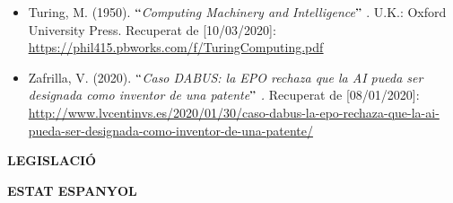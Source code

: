 \documentclass[12pt]{article}
\begin{document}
\begin{itemize}
\vspace{\baselineskip}
	\item Turing, M. (1950). \textit{$``$Computing Machinery and Intelligence$"$ }. U.K.: Oxford University Press. Recuperat de [10/03/2020]: \href{https://phil415.pbworks.com/f/TuringComputing.pdf}{\textcolor[HTML]{0000FF}{\ul{https://phil415.pbworks.com/f/TuringComputing.pdf}}}\par


\vspace{\baselineskip}
	\item Zafrilla, V. (2020). $``$\textit{Caso DABUS: la EPO rechaza que la AI pueda ser designada como inventor de una patente$"$ .} Recuperat de [08/01/2020]: \href{http://www.lvcentinvs.es/2020/01/30/caso-dabus-la-epo-rechaza-que-la-ai-pueda-ser-designada-como-inventor-de-una-patente/}{http://www.lvcentinvs.es/2020/01/30/caso-dabus-la-epo-rechaza-que-la-ai-pueda-ser-designada-como-inventor-de-una-patente/}
\end{itemize}\par


\vspace{\baselineskip}

\vspace{\baselineskip}

\vspace{\baselineskip}

\vspace{\baselineskip}

\vspace{\baselineskip}

\vspace{\baselineskip}

\vspace{\baselineskip}
\begin{Center}
{\fontsize{16pt}{19.2pt}\selectfont \textbf{LEGISLACIÓ}\par}
\end{Center}\par


\vspace{\baselineskip}

\vspace{\baselineskip}

\vspace{\baselineskip}
\begin{justify}
\textbf{ESTAT ESPANYOL}
\end{justify}\par
\end{document}
